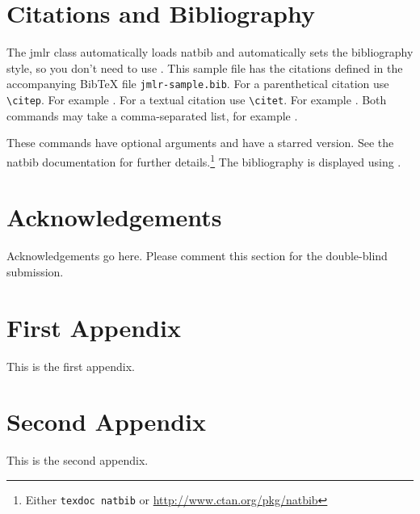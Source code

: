 \documentclass[letterpaper,10pt]{article}
\begin{document}
\section{Citations and Bibliography}
\label{sec:cite}

The \textsf{jmlr} class automatically loads \textsf{natbib}
and automatically sets the bibliography style, so you don't need to
use \verb||.
This sample file has the citations defined in the accompanying
BibTeX file \texttt{jmlr-sample.bib}. For a parenthetical
citation use \verb|\citep|. For example
\citep{guyon-elisseeff-03}. For a textual citation use
\verb|\citet|. For example \citet{guyon2007causalreport}.
Both commands may take a comma-separated list, for example
\citet{guyon-elisseeff-03,guyon2007causalreport}.

These commands have optional arguments and have a starred
version. See the \textsf{natbib} documentation for further
details.\footnote{Either \texttt{texdoc natbib} or
  \url{http://www.ctan.org/pkg/natbib}}
The bibliography is displayed using \verb||.

\clearpage

\section*{Acknowledgements}

Acknowledgements go here.
Please comment this section for the double-blind submission.



\clearpage

\appendix

\section{First Appendix}\label{apd:first}

This is the first appendix.

\section{Second Appendix}\label{apd:second}

This is the second appendix.
\end{document}
